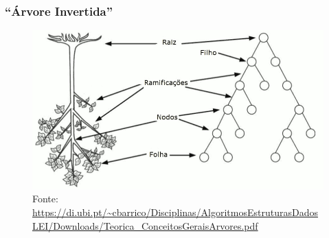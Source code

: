 \documentclass[aspectratio=169]{beamer}
\begin{document}
\begin{frame}\frametitle{``Árvore Invertida''}
\begin{figure}[h]
	\centering
	\includegraphics[height=0.60\paperheight]{imagens/arvore_invertida.png}\\
{\tiny Fonte: \url{https://di.ubi.pt/~cbarrico/Disciplinas/AlgoritmosEstruturasDadosLEI/Downloads/Teorica_ConceitosGeraisArvores.pdf}}
\end{figure}
\end{frame}
\end{document}
